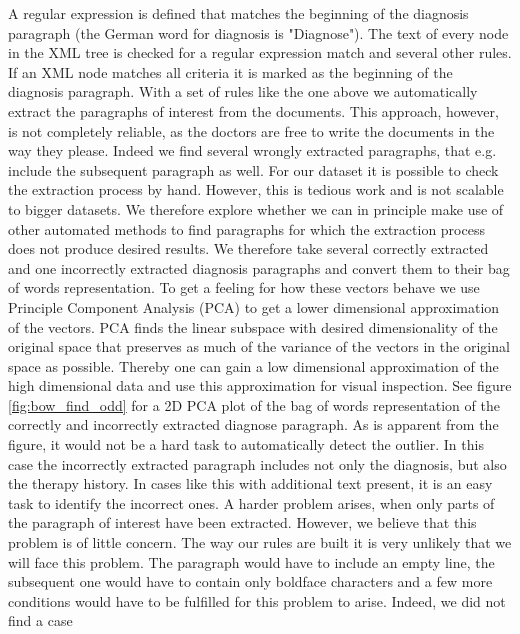 \bigskip

A regular expression is defined that matches the beginning of the diagnosis paragraph (the German word for diagnosis is "Diagnose").
The text of every node in the XML tree is checked for a regular expression match and several other rules. If an XML node matches all criteria it is marked as the beginning of the diagnosis paragraph.
With a set of rules like the one above we automatically extract the
paragraphs of interest from the documents. This approach, however,
is not completely reliable, as the doctors are free to write the documents
in the way they please. Indeed we find several wrongly extracted paragraphs,
that e.g. include the subsequent paragraph as well. For our dataset
it is possible to check the extraction process by hand. However, this
is tedious work and is not scalable to bigger
datasets. We therefore explore whether we can in principle make use
of other automated methods to find paragraphs for which the extraction
process does not produce desired results. We therefore take several correctly extracted and one incorrectly extracted
diagnosis paragraphs and convert them to their bag of words representation.
To get a feeling for how these vectors behave we use Principle Component
Analysis (PCA) to get a lower dimensional approximation of the vectors. PCA finds the linear
subspace with desired dimensionality of the original space that preserves as much of the variance of the vectors in the original space as possible. Thereby one can gain a low dimensional approximation of the high dimensional data and use this approximation for visual inspection.
See figure \ref{fig:bow_find_odd} for a 2D PCA plot of the bag of words representation
of the correctly and incorrectly extracted diagnose paragraph. As is apparent from the figure, it would not be a
hard task to automatically detect the outlier. In this case the incorrectly
extracted paragraph includes not only the diagnosis, but also the
therapy history. In cases like this with additional text present, it is an easy task to
identify the incorrect ones. A harder problem arises, when only parts
of the paragraph of interest have been extracted. However, we believe
that this problem is of little concern. The way our rules are built it
is very unlikely that we will face this problem. The paragraph would
have to include an empty line, the subsequent one would have to contain
only boldface characters and a few more conditions would have to be
fulfilled for this problem to arise. Indeed, we did not find a case
